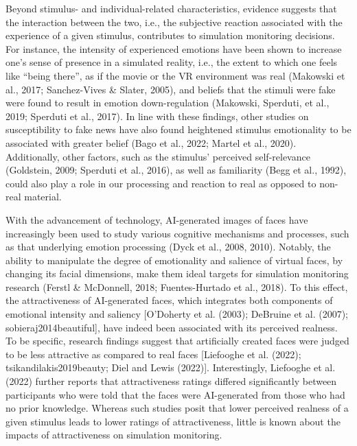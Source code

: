 \documentclass[
  man,floatsintext]{apa6}
\begin{document}
Beyond stimulus- and individual-related characteristics, evidence suggests that the interaction between the two, i.e., the subjective reaction associated with the experience of a given stimulus, contributes to simulation monitoring decisions. For instance, the intensity of experienced emotions have been shown to increase one's sense of presence in a simulated reality, i.e., the extent to which one feels like ``being there'', as if the movie or the VR environment was real (Makowski et al., 2017; Sanchez-Vives \& Slater, 2005), and beliefs that the stimuli were fake were found to result in emotion down-regulation (Makowski, Sperduti, et al., 2019; Sperduti et al., 2017). In line with these findings, other studies on susceptibility to fake news have also found heightened stimulus emotionality to be associated with greater belief (Bago et al., 2022; Martel et al., 2020). Additionally, other factors, such as the stimulus' perceived self-relevance (Goldstein, 2009; Sperduti et al., 2016), as well as familiarity (Begg et al., 1992), could also play a role in our processing and reaction to real as opposed to non-real material.

With the advancement of technology, AI-generated images of faces have increasingly been used to study various cognitive mechanisms and processes, such as that underlying emotion processing (Dyck et al., 2008, 2010). Notably, the ability to manipulate the degree of emotionality and salience of virtual faces, by changing its facial dimensions, make them ideal targets for simulation monitoring research (Ferstl \& McDonnell, 2018; Fuentes-Hurtado et al., 2018). To this effect, the attractiveness of AI-generated faces, which integrates both components of emotional intensity and saliency {[}O'Doherty et al. (2003); DeBruine et al. (2007); sobieraj2014beautiful{]}, have indeed been associated with its perceived realness. To be specific, research findings suggest that artificially created faces were judged to be less attractive as compared to real faces {[}Liefooghe et al. (2022); tsikandilakis2019beauty; Diel and Lewis (2022){]}. Interestingly, Liefooghe et al. (2022) further reports that attractiveness ratings differed significantly between participants who were told that the faces were AI-generated from those who had no prior knowledge. Whereas such studies posit that lower perceived realness of a given stimulus leads to lower ratings of attractiveness, little is known about the impacts of attractiveness on simulation monitoring.
\end{document}
